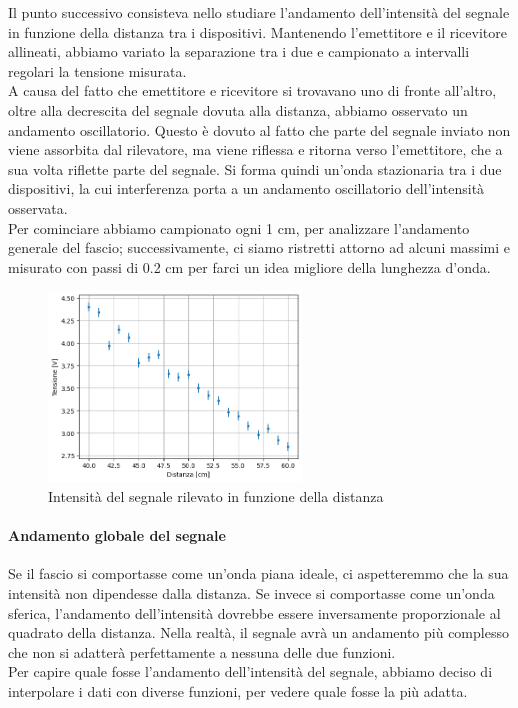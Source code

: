\documentclass[letterpaper,12pt]{article}
\begin{document}
Il punto successivo consisteva nello studiare l'andamento dell'intensità del segnale in funzione della distanza tra i
dispositivi. Mantenendo l'emettitore e il ricevitore allineati, abbiamo variato la separazione tra i due
e campionato a intervalli regolari la tensione misurata.\\
A causa del fatto che emettitore e ricevitore si trovavano uno di fronte all'altro, oltre alla decrescita
del segnale dovuta alla distanza, abbiamo osservato un andamento oscillatorio. Questo è dovuto al fatto che
parte del segnale inviato non viene assorbita dal rilevatore, ma viene riflessa e ritorna verso l'emettitore,
che a sua volta riflette parte del segnale. Si forma quindi un'onda stazionaria tra i due dispositivi,
la cui interferenza porta a un andamento oscillatorio dell'intensità osservata.\\
Per cominciare abbiamo campionato ogni 1 cm, per analizzare l'andamento generale del fascio; successivamente,
ci siamo ristretti attorno ad alcuni massimi e misurato con passi di 0.2 cm per farci un idea migliore della lunghezza d'onda.\\

\begin{figure}[h!]
	\centering
	\includegraphics[width = 0.6\textwidth]{dati_distanza.png}
	\caption{Intensità del segnale rilevato in funzione della distanza}
	\label{fig:distanza}
\end{figure}

\paragraph*{Andamento globale del segnale}
Se il fascio si comportasse come un'onda piana ideale, ci aspetteremmo che la sua intensità non dipendesse dalla distanza.
Se invece si comportasse come un'onda sferica, l'andamento dell'intensità dovrebbe essere inversamente proporzionale
al quadrato della distanza. Nella realtà, il segnale avrà un andamento più complesso che non si adatterà perfettamente
a nessuna delle due funzioni.\\
Per capire quale fosse l'andamento dell'intensità del segnale, abbiamo deciso di interpolare i dati con diverse funzioni,
per vedere quale fosse la più adatta.\\
\end{document}

